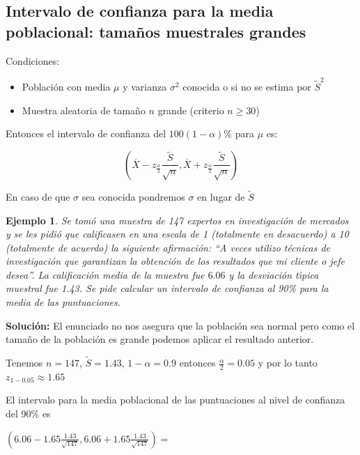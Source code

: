 \documentclass[12pt]{report}
\newtheorem{example}[definition]{Ejemplo}
\begin{document}
        \subsection{Intervalo de confianza para la media
        poblacional: tama\~{n}os muestrales grandes}

     Condiciones:

    \begin{itemize}
    \item Poblaci\'on con media $\mu$ y varianza $\sigma^2$ conocida
    o  si no se estima por $\tilde{S}^2$
    \item Muestra aleatoria de tama\~{n}o $n$ grande (criterio $n\geq 30$)
    \end{itemize}

    Entonces el intervalo de confianza del $100(1-\alpha)\%$ para $\mu$
    es:

    $$\left( \overline{X}-z_{\frac{\alpha}{2}}\frac{\tilde{S}}{\sqrt{n}},
    \overline{X}+z_{\frac{\alpha}{2}}\frac{\tilde{S}}{\sqrt{n}}\right)$$

    En caso de que $\sigma$ sea conocida pondremos $\sigma$ en lugar de $\tilde{S}$

    \begin{example}
    Se tom\'o una muestra de 147 expertos en investigaci\'on de mercados y se
    les pidi\'o que calificasen en una escala de 1 (totalmente en
    desacuerdo) a 10 (totalmente de acuerdo) la siguiente afirmaci\'on:
    ``A veces utilizo t\'ecnicas de investigaci\'on que garantizan la
    obtenci\'on de los resultados que mi cliente o jefe desea''. La
    calificaci\'on media de la muestra fue $6.06$ y la desviaci\'on t\'{\i}pica
    muestral fue 1.43. Se pide calcular un intervalo de confianza al
    90\% para la media de las puntuaciones.
    \end{example}

        \textbf{Soluci\'on:}
        El enunciado no nos asegura que la poblaci\'on sea normal pero como el
        tama\~{n}o de la poblaci\'on es grande podemos aplicar el resultado anterior.


        Tenemos $n=147$, $\tilde{S}=1.43$, $1-\alpha=0.9$ entonces
        $\frac{\alpha}{2}=0.05$ y por lo tanto $z_{1-0.05}\approx 1.65$

        El intervalo para la media poblacional de las puntuaciones
        al nivel de confianza del 90\% es

        $\left(6.06-1.65 \frac{1.43}{\sqrt{147}},6.06+1.65
        \frac{1.43}{\sqrt{147}}\right)= $
\end{document}

